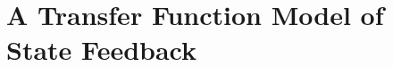 


\section*{A Transfer Function Model of State Feedback} %
\label{sec:a_transfer_function_model_of_state_feedback}


\ifslidesonly
\begin{slide}
   
\end{slide}
\fi


\ifslidesonly
\begin{slide}
   
\end{slide}
\fi




\endinput


